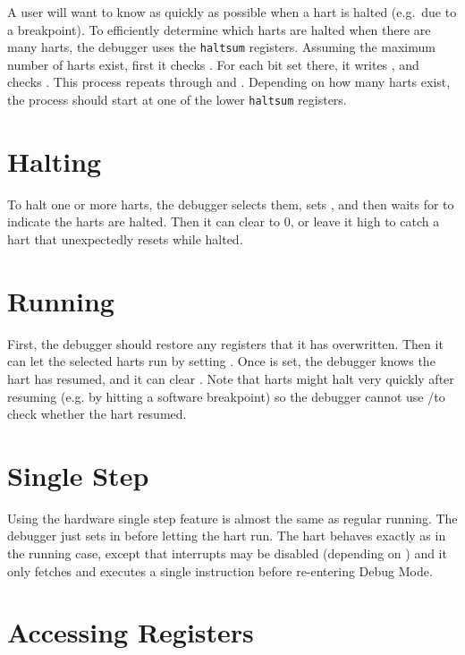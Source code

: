 A user will want to know as quickly as possible when a hart is halted (e.g.\ due
to a breakpoint).  To efficiently determine which harts are halted when there
are many harts, the debugger uses the {\tt haltsum} registers. Assuming the
maximum number of harts exist, first it checks \Rhaltsumthree. For each bit set
there, it writes \Fhartsel, and checks \Rhaltsumtwo. This process repeats
through \Rhaltsumone and \Rhaltsumzero. Depending on how many harts exist, the
process should start at one of the lower {\tt haltsum} registers.

\section{Halting} \label{deb:halt}

To halt one or more harts, the debugger selects them, sets \Fhaltreq, and then
waits for \Fallhalted to indicate the harts are halted. Then it can clear
\Fhaltreq to 0, or leave it high to catch a hart that unexpectedly resets while
halted.

\section{Running}

First, the debugger should restore any registers that it has overwritten.
Then it can let the selected harts run by setting \Fresumereq. Once
\Fallresumeack is set, the debugger knows the hart has resumed, and it can
clear \Fresumereq. Note that harts might halt very quickly after resuming (e.g.
by hitting a software breakpoint) so the debugger cannot use
\Fallhalted/\Fanyhalted to check whether the hart resumed.

\section{Single Step}

Using the hardware single step feature is almost the same as regular running.
The debugger just sets \Fstep in \Rdcsr before letting the hart run. The hart
behaves exactly as in the running case, except that interrupts may be disabled
(depending on \Fstepie) and it only fetches and executes a single instruction
before re-entering Debug Mode.

\section{Accessing Registers}

